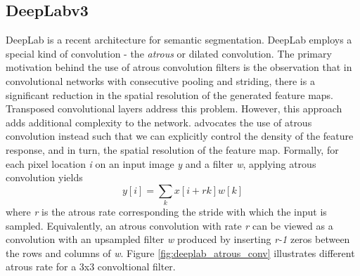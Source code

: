 \documentclass[journal]{IEEEtran}
\begin{document}
\subsection{DeepLabv3}
DeepLab\cite{DBLP:journals/corr/ChenPSA17} is a recent architecture for semantic segmentation. DeepLab employs a special kind of convolution - the \textit{atrous} or dilated convolution. The primary motivation behind the use of atrous convolution filters is the observation that in convolutional networks with consecutive pooling and striding, there is a significant reduction in the spatial resolution of the generated feature maps. Transposed convolutional layers address this problem. However, this approach adds additional complexity to the network. \cite{DBLP:journals/corr/ChenPSA17} advocates the use of atrous convolution instead such that we can explicitly control the density of the feature response, and in turn, the spatial resolution of the feature map. Formally, for each pixel location \textit{i} on an input image \textit{y} and a filter \textit{w}, applying atrous convolution yields
\begin{equation}
y[i] = \sum_k x[i+rk]w[k]
\end{equation}
where \textit{r} is the atrous rate corresponding the stride with which the input is sampled. Equivalently, an atrous convolution with rate \textit{r} can be viewed as a convolution with an upsampled filter \textit{w} produced by inserting \textit{r-1} zeros between the rows and columns of \textit{w}. Figure \ref{fig:deeplab_atrous_conv} illustrates different atrous rate for a 3x3 convoltional filter.
\end{document}

